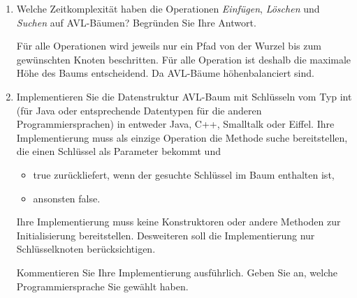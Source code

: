 \documentclass{bschlangaul-aufgabe}
\begin{document}
\begin{enumerate}
\begin{bAntwort}
\begin{bBaum}{Nach dem Einfügen von „3“}
\end{bBaum}
\end{bAntwort}

\item Welche Zeitkomplexität haben die Operationen \emph{Einfügen},
\emph{Löschen} und \emph{Suchen} auf AVL-Bäumen? Begründen Sie Ihre
Antwort.

\begin{bAntwort}
Für alle Operationen wird jeweils nur ein Pfad von der Wurzel bis zum
gewünschten Knoten beschritten. Für alle Operation ist deshalb die
maximale Höhe des Baums entscheidend. Da AVL-Bäume höhenbalanciert sind.

\end{bAntwort}

\item Implementieren Sie die Datenstruktur AVL-Baum mit Schlüsseln vom
Typ int (für Java oder entsprechende Datentypen für die anderen
Programmiersprachen) in entweder Java, C++, Smalltalk oder Eiffel. Ihre
Implementierung muss als einzige Operation die Methode suche
bereitstellen, die einen Schlüssel als Parameter bekommt und

\begin{itemize}
\item true zurückliefert, wenn der gesuchte Schlüssel im Baum enthalten
ist,

\item ansonsten false.
\end{itemize}

Ihre Implementierung muss keine Konstruktoren oder andere Methoden zur
Initialisierung bereitstellen. Desweiteren soll die Implementierung nur
Schlüsselknoten berücksichtigen.

Kommentieren Sie Ihre Implementierung ausführlich. Geben Sie an, welche
Programmiersprache Sie gewählt haben.
\end{enumerate}

\end{document}
